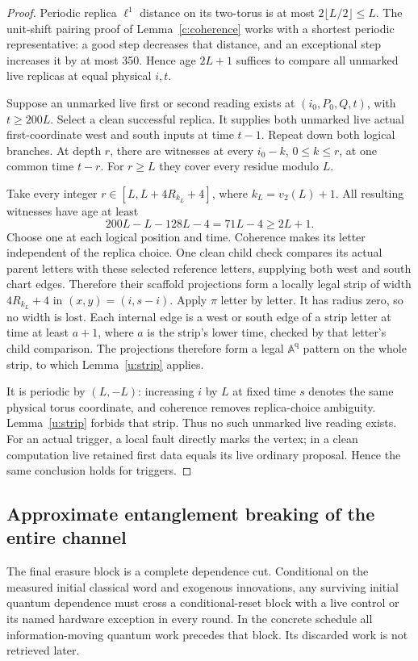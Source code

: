 \begin{proof}
Periodic replica \(\ell^1\) distance on its two-torus is at most
\(2\lfloor L/2\rfloor\le L\). The unit-shift pairing proof of
Lemma~\ref{c:coherence} works with a shortest periodic representative:
a good step decreases that distance, and an exceptional step increases
it by at most 350. Hence age \(2L+1\) suffices to compare all
unmarked live replicas at equal physical \(i,t\).

Suppose an unmarked live first or second reading exists at
\((i_0,P_0,Q,t)\), with \(t\ge200L\). Select a clean successful
replica. It supplies both unmarked live actual first-coordinate west
and south inputs at time \(t-1\). Repeat down both logical branches.
At depth \(r\), there are witnesses at every
\(i_0-k\), \(0\le k\le r\), at one common time \(t-r\).
For \(r\ge L\) they cover every residue modulo \(L\).

Take every integer \(r\in[L,L+4R_{k_L}+4]\), where \(k_L=v_2(L)+1\).
All resulting witnesses have age at least
\[
 200L-L-128L-4=71L-4\ge2L+1.
\]
Choose one at each logical position and time. Coherence makes its
letter independent of the replica choice. One clean child check
compares its actual parent letters with these selected reference
letters, supplying both west and south chart edges. Therefore their
scaffold projections form a locally legal strip of width
\(4R_{k_L}+4\) in \((x,y)=(i,s-i)\).
Apply \(\pi\) letter by letter. It has radius zero, so no width is
lost. Each internal edge is a west or south edge of a strip letter
at time at least \(a+1\), where \(a\) is the strip's lower time,
checked by that letter's child comparison. The projections therefore
form a legal \(\mathbb A^{\mathrm q}\) pattern on the whole strip,
to which Lemma~\ref{u:strip} applies.

It is periodic by \((L,-L)\): increasing \(i\) by \(L\) at fixed
time \(s\) denotes the same physical torus coordinate, and
coherence removes replica-choice ambiguity. Lemma~\ref{u:strip}
forbids that strip. Thus no such unmarked live reading exists.
For an actual trigger, a local fault directly marks the vertex; in a
clean computation live retained first data equals its live ordinary
proposal. Hence the same conclusion holds for triggers.
\end{proof}

\subsection{Approximate entanglement breaking of the entire channel}
The final erasure block is a complete dependence cut. Conditional on
the measured initial classical word and exogenous innovations, any
surviving initial quantum dependence must cross a conditional-reset block with a live control or
its named hardware exception in every round. In the concrete
schedule all information-moving quantum work precedes that block.
Its discarded work is not retrieved later.

